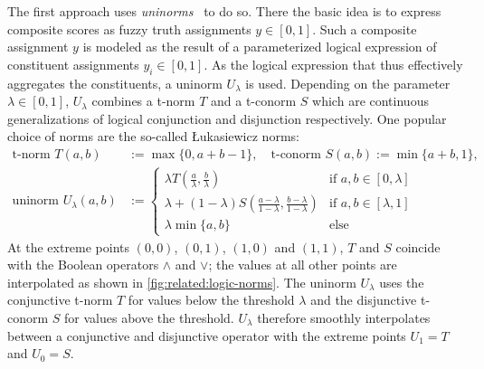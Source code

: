 The first approach uses \textit{uninorms}~\cite{Melnikov2016} to do so.
There the basic idea is to express composite scores as fuzzy truth assignments $y \in [0, 1]$.
Such a composite assignment $y$ is modeled as the result of a parameterized logical expression of constituent assignments $y_i \in [0, 1]$.
As the logical expression that thus effectively aggregates the constituents, a uninorm $U_{\lambda}$ is used.
Depending on the parameter $\lambda \in [0, 1]$, $U_{\lambda}$ combines a t-norm $T$ and a t-conorm $S$ which are continuous generalizations of logical conjunction and disjunction respectively.
One popular choice of norms are the so-called Łukasiewicz norms:
\begin{align}
	\text{t-norm } T(a, b) &:= \max \{ 0, a + b - 1 \}, \quad\text{t-conorm } S(a, b) := \min \{ a + b, 1 \}, \nonumber \\
	\text{uninorm } U_\lambda(a, b) &:= \begin{cases}
		\lambda T\left(\frac{a}{\lambda}, \frac{b}{\lambda}\right) & \text{if } a, b \in [0, \lambda] \\
		\lambda + (1 - \lambda) S\left(\frac{a - \lambda}{1 - \lambda}, \frac{b - \lambda}{1 - \lambda}\right) & \text{if } a, b \in [\lambda, 1] \\
		\lambda \min \{ a, b \} & \text{else}
	\end{cases}
\end{align}
At the extreme points $(0, 0)$, $(0, 1)$, $(1, 0)$ and $(1, 1)$, $T$ and $S$ coincide with the Boolean operators $\land$ and $\lor$;
the values at all other points are interpolated as shown in \cref{fig:related:logic-norms}.
The uninorm $U_\lambda$ uses the conjunctive t-norm $T$ for values below the threshold $\lambda$ and the disjunctive t-conorm $S$ for values above the threshold.
$U_\lambda$ therefore smoothly interpolates between a conjunctive and disjunctive operator with the extreme points $U_1 = T$ and $U_0 = S$.
